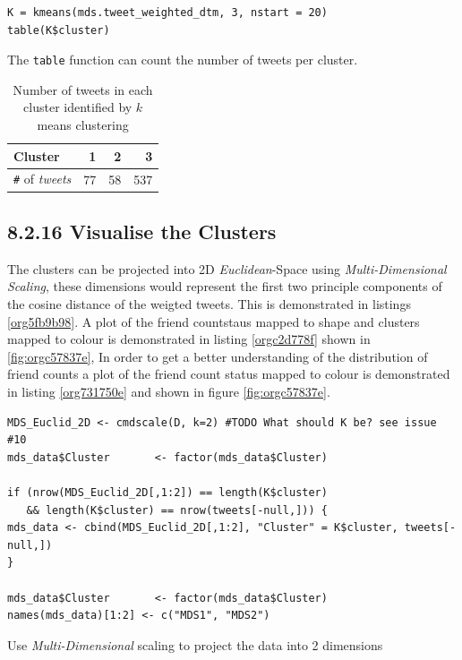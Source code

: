 \documentclass[11pt]{article}
\begin{document}
\begin{listing}[htbp]
\begin{verbatim}
K = kmeans(mds.tweet_weighted_dtm, 3, nstart = 20)
table(K$cluster)
\end{verbatim}
\caption{\label{org2715bcd}The \texttt{table} function can count the number of tweets per cluster.}
\end{listing}

\begin{table}[htbp]
\caption{\label{tab:org62d2295}Number of tweets in each cluster identified by \(k\) means clustering}
\centering
\begin{tabular}{lrrr}
Cluster & 1 & 2 & 3\\
\hline
\texttt{\#} of \emph{tweets} & 77 & 58 & 537\\
\end{tabular}
\end{table}

\subsection{8.2.16 Visualise the Clusters}
\label{sec:org6ece79e}
The clusters can be projected into 2D \emph{Euclidean}-Space using \emph{Multi-Dimensional
Scaling}, these dimensions would represent the first two principle components of
the cosine distance of the weigted tweets. This is demonstrated in listings
\ref{org5fb9b98}. A plot of the friend countstaus mapped to shape and clusters mapped to
colour is demonstrated in listing \ref{orgc2d778f} shown in \ref{fig:orgc57837e}, In order to get a better
understanding of the distribution of friend counts a plot of the friend count
status mapped to colour is demonstrated in listing \ref{org731750e} and shown in figure \ref{fig:orgc57837e}.


\begin{listing}[htbp]
\begin{verbatim}
MDS_Euclid_2D <- cmdscale(D, k=2) #TODO What should K be? see issue #10
mds_data$Cluster       <- factor(mds_data$Cluster)

if (nrow(MDS_Euclid_2D[,1:2]) == length(K$cluster)
   && length(K$cluster) == nrow(tweets[-null,])) {
mds_data <- cbind(MDS_Euclid_2D[,1:2], "Cluster" = K$cluster, tweets[-null,])
}

mds_data$Cluster       <- factor(mds_data$Cluster)
names(mds_data)[1:2] <- c("MDS1", "MDS2")
\end{verbatim}
\caption{\label{org5fb9b98}Use \emph{Multi-Dimensional} scaling to project the data into 2 dimensions}
\end{listing}
\end{document}
